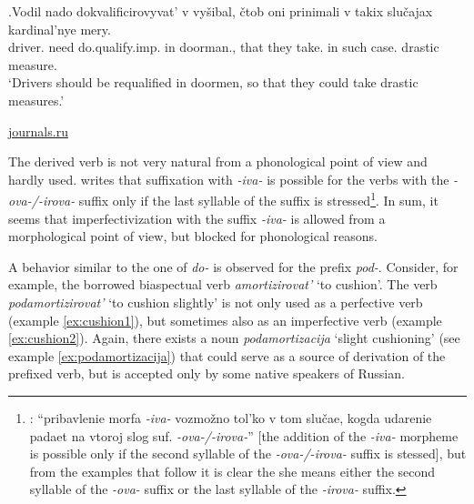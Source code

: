 \exg.\label{ex:dokvalificirovyvat}Vodil nado dokvalificirovyvat' v vy\v{s}ibal, \v{c}tob oni prinimali v takix slu\v{c}ajax kardinal'nye mery.\\
driver. need do.qualify.imp. in doorman., that they take. in such case. drastic measure.\\
\trans `Drivers should be requalified in doormen, so that they could take drastic measures.'
\begin{flushright}
\vspace{-0.5em}
\url{journals.ru}
\end{flushright}

The derived verb is not very natural from a phonological point of view and hardly used. \citet[590]{Shvedova:82} writes that suffixation with \textit{-iva-} is possible for the verbs with the \textit{-ova-/-irova-} suffix only if the last syllable of the suffix is stressed\footnote{\citet[590]{Shvedova:82}: ``pribavlenie morfa \textit{-­iva-} vozmo\v{z}no tol'ko v tom slu\v{c}ae, kogda udarenie padaet na vtoroj slog suf. \textit{-­ova-/-irova-}'' [the addition of the \textit{-iva-} morpheme is possible only if the second syllable of the \textit{-­ova-/-irova-} suffix is stessed], but from the examples that follow it is clear the she means either the second syllable of the \textit{-ova-} suffix or the last syllable of the \textit{-irova-} suffix.}. In sum, it seems that imperfectivization with the suffix \textit{-iva-} is allowed from a morphological point of view, but blocked for phonological reasons.
 
A behavior similar to the one of \textit{do-} is observed for the prefix \textit{pod-}. Consider, for example, the borrowed biaspectual verb \textit{amortizirovat'} `to cushion'. The verb \textit{podamortizirovat'} `to cushion slightly' is not only used as a perfective verb (example \ref{ex:cushion1}), but sometimes also as an imperfective verb (example \ref{ex:cushion2}). Again, there exists a noun \textit{podamortizacija} `slight cushioning' (see example \ref{ex:podamortizacija}) that could serve as a source of derivation of the prefixed verb, but is accepted only by some native speakers of Russian.


